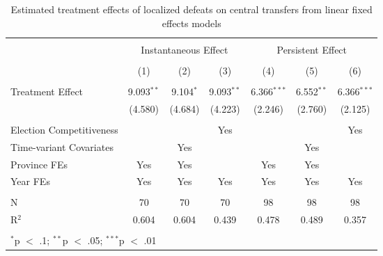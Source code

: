 
\begin{table}[!htbp] \centering 
  \caption{Estimated treatment effects of localized defeats on central transfers from linear fixed effects models} 
  \label{tab:lfe_main} 
\begin{tabular}{@{\extracolsep{5pt}}lcccccc} 
\\[-1.8ex]\hline 
\hline \\[-1.8ex] 
 & \multicolumn{3}{c}{Instantaneous Effect} & \multicolumn{3}{c}{Persistent Effect} \\ 
\\[-1.8ex] & (1) & (2) & (3) & (4) & (5) & (6)\\ 
\hline \\[-1.8ex] 
 Treatment Effect & 9.093$^{**}$ & 9.104$^{*}$ & 9.093$^{**}$ & 6.366$^{***}$ & 6.552$^{**}$ & 6.366$^{***}$ \\ 
  & (4.580) & (4.684) & (4.223) & (2.246) & (2.760) & (2.125) \\ 
 \hline \\[-1.8ex] 
Election Competitiveness &  &  & Yes &  &  & Yes \\ 
Time-variant Covariates &  & Yes &  &  & Yes &  \\ 
Province FEs & Yes & Yes &  & Yes & Yes &  \\ 
Year FEs & Yes & Yes & Yes & Yes & Yes & Yes \\ 
\hline \\[-1.8ex] 
N & 70 & 70 & 70 & 98 & 98 & 98 \\ 
R$^{2}$ & 0.604 & 0.604 & 0.439 & 0.478 & 0.489 & 0.357 \\ 
\hline 
\hline \\[-1.8ex] 
\multicolumn{7}{l}{$^{*}$p $<$ .1; $^{**}$p $<$ .05; $^{***}$p $<$ .01} \\ 
\end{tabular} 
\end{table} 
